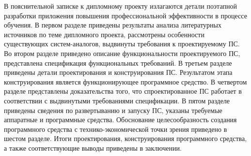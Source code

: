 В пояснительной записке к дипломному проекту излагаются детали поэтапной разработки приложения повышения профессиональной эффективности в процессе обучения. В первом разделе приведены результаты анализа литературных источников по теме дипломного проекта, рассмотрены особенности существующих систем-аналогов, выдвинуты требования к проектируемому ПС. Во втором разделе приведено описание функциональности проектируемого ПС, представлена спецификация функциональных требований. В третьем разделе приведены детали проектирования и конструирования ПС. Результатом этапа конструирования является функционирующее программное средство. В четвертом разделе представлены доказательства того, что спроектированное ПС работает в соответствии с выдвинутыми требованиями спецификации. В пятом разделе приведены сведения по развертыванию и запуску ПС, указаны требуемые аппаратные и программные средства. Обоснование целесообразность создания программного средства с технико-экономической точки зрения приведено в шестом разделе. Итоги проектирования, конструирования программного средства, а также соответствующие выводы приведены в заключении.
